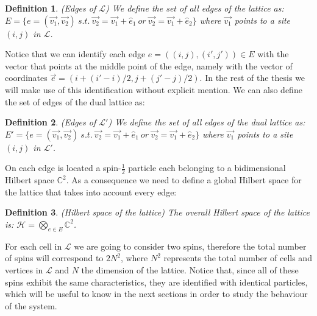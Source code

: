 \documentclass{Configuration_Files/PoliMi3i_thesis}
\newtheorem{definition}{Definition}[chapter]
\begin{document}
\begin{definition}(Edges of $\mathcal{L}$)
	We define the set of all edges of the lattice as: $E = \{e=(\vec{v_1},\vec{v_2}) \ s.t. \ \vec{v_2}=\vec{v_1}+\hat{e}_1 \ or \ \vec{v_2}=\vec{v_1}+\hat{e}_2 \}$ where $\vec{v_1}$ points to a site $(i, j)$ in $\mathcal{L}$. 
\end{definition}

Notice that we can identify each edge $e=((i,j),(i',j')) \in E$ with the vector that points at the middle point of the edge, namely with the vector of coordinates $\vec{e}=(i + (i'-i)/2, j + (j'-j)/2)$. In the rest of the thesis we will make use of this identification without explicit mention. We can also define the set of edges of the dual lattice as:

\begin{definition}(Edges of $\mathcal{L'}$)
	We define the set of all edges of the dual lattice as: $E' = \{e=(\vec{v_1},\vec{v_2}) \ s.t. \ \vec{v_2}=\vec{v_1}+\hat{e}_1 \ or \ \vec{v_2}=\vec{v_1}+\hat{e}_2 \}$ where $\vec{v_1}$ points to a site $(i, j)$ in $\mathcal{L'}$. 
\end{definition}

On each edge is located a spin-$\frac{1}{2}$ particle each belonging to a bidimensional Hilbert space $\mathbb{C}^2$. As a consequence we need to define a global Hilbert space for the lattice that takes into account every edge:

\begin{definition}(Hilbert space of the lattice)
	The overall Hilbert space of the lattice is: $\mathscr{H}= \bigotimes_{e \in E} \mathbb{C}^2$.
\end{definition}

For each cell in $\mathcal{L}$ we are going to consider two spins, therefore the total number of spins will correspond to $2N^2$, where $N^2$ represents the total number of cells and vertices in $\mathcal{L}$ and $N$ the dimension of the lattice. \newline
Notice that, since all of these spins exhibit the same characteristics, they are identified with identical particles, which will be useful to know in the next sections in order to study the behaviour of the system.
\end{document}
